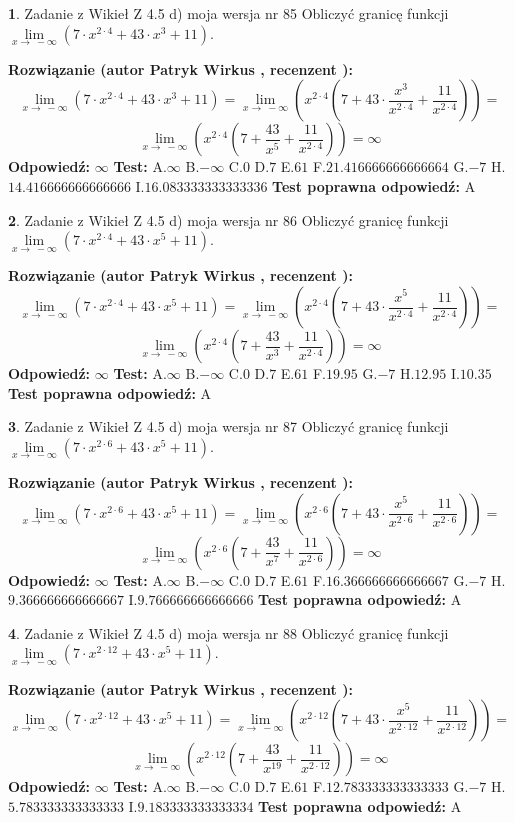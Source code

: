 \documentclass[12pt, a4paper]{article}
\theoremstyle{definition} %
\newtheorem{zad}{}
\newcommand{\zadStart}[1]{\begin{zad}#1\newline}
\newcommand{\zadStop}{\end{zad}}
\newcommand{\rozwStart}[2]{\noindent \textbf{Rozwiązanie (autor #1 , recenzent #2): }\newline}
\newcommand{\rozwStop}{\newline}
\newcommand{\odpStart}{\noindent \textbf{Odpowiedź:}\newline}
\newcommand{\odpStop}{\newline}
\newcommand{\testStart}{\noindent \textbf{Test:}\newline}
\newcommand{\testStop}{\newline}
\newcommand{\kluczStart}{\noindent \textbf{Test poprawna odpowiedź:}\newline}
\newcommand{\kluczStop}{\newline}
\begin{document}
\zadStart{Zadanie z Wikieł Z 4.5 d) moja wersja nr 85}
Obliczyć granicę funkcji  $\lim\limits_{x\to\ -\infty}(7 \cdot x^{2\cdot4}+43 \cdot x^{3}+11)$.
\zadStop
\rozwStart{Patryk Wirkus}{}
$$\lim\limits_{x\to\ -\infty}(7 \cdot x^{2\cdot4}+43 \cdot x^{3}+11) = \lim\limits_{x\to\ -\infty}(x^{2\cdot4}(7 +43 \cdot \frac{x^{3}}{x^{2\cdot4}}+\frac{11}{x^{2\cdot4}})) =$$ $$\lim\limits_{x\to\ -\infty}(x^{2\cdot4}(7 +\frac{43}{x^{5}}+\frac{11}{x^{2\cdot4}})) =\infty$$
\rozwStop
\odpStart
$\infty$
\odpStop
\testStart
A.$\infty$ B.$-\infty$ C.$0$ D.$7$ E.$61$
F.$21.416666666666664$ G.$-7$
H.$14.416666666666666$
I.$16.083333333333336$
\testStop
\kluczStart
A
\kluczStop



\zadStart{Zadanie z Wikieł Z 4.5 d) moja wersja nr 86}
Obliczyć granicę funkcji  $\lim\limits_{x\to\ -\infty}(7 \cdot x^{2\cdot4}+43 \cdot x^{5}+11)$.
\zadStop
\rozwStart{Patryk Wirkus}{}
$$\lim\limits_{x\to\ -\infty}(7 \cdot x^{2\cdot4}+43 \cdot x^{5}+11) = \lim\limits_{x\to\ -\infty}(x^{2\cdot4}(7 +43 \cdot \frac{x^{5}}{x^{2\cdot4}}+\frac{11}{x^{2\cdot4}})) =$$ $$\lim\limits_{x\to\ -\infty}(x^{2\cdot4}(7 +\frac{43}{x^{3}}+\frac{11}{x^{2\cdot4}})) =\infty$$
\rozwStop
\odpStart
$\infty$
\odpStop
\testStart
A.$\infty$ B.$-\infty$ C.$0$ D.$7$ E.$61$
F.$19.95$ G.$-7$
H.$12.95$
I.$10.35$
\testStop
\kluczStart
A
\kluczStop



\zadStart{Zadanie z Wikieł Z 4.5 d) moja wersja nr 87}
Obliczyć granicę funkcji  $\lim\limits_{x\to\ -\infty}(7 \cdot x^{2\cdot6}+43 \cdot x^{5}+11)$.
\zadStop
\rozwStart{Patryk Wirkus}{}
$$\lim\limits_{x\to\ -\infty}(7 \cdot x^{2\cdot6}+43 \cdot x^{5}+11) = \lim\limits_{x\to\ -\infty}(x^{2\cdot6}(7 +43 \cdot \frac{x^{5}}{x^{2\cdot6}}+\frac{11}{x^{2\cdot6}})) =$$ $$\lim\limits_{x\to\ -\infty}(x^{2\cdot6}(7 +\frac{43}{x^{7}}+\frac{11}{x^{2\cdot6}})) =\infty$$
\rozwStop
\odpStart
$\infty$
\odpStop
\testStart
A.$\infty$ B.$-\infty$ C.$0$ D.$7$ E.$61$
F.$16.366666666666667$ G.$-7$
H.$9.366666666666667$
I.$9.766666666666666$
\testStop
\kluczStart
A
\kluczStop



\zadStart{Zadanie z Wikieł Z 4.5 d) moja wersja nr 88}
Obliczyć granicę funkcji  $\lim\limits_{x\to\ -\infty}(7 \cdot x^{2\cdot12}+43 \cdot x^{5}+11)$.
\zadStop
\rozwStart{Patryk Wirkus}{}
$$\lim\limits_{x\to\ -\infty}(7 \cdot x^{2\cdot12}+43 \cdot x^{5}+11) = \lim\limits_{x\to\ -\infty}(x^{2\cdot12}(7 +43 \cdot \frac{x^{5}}{x^{2\cdot12}}+\frac{11}{x^{2\cdot12}})) =$$ $$\lim\limits_{x\to\ -\infty}(x^{2\cdot12}(7 +\frac{43}{x^{19}}+\frac{11}{x^{2\cdot12}})) =\infty$$
\rozwStop
\odpStart
$\infty$
\odpStop
\testStart
A.$\infty$ B.$-\infty$ C.$0$ D.$7$ E.$61$
F.$12.783333333333333$ G.$-7$
H.$5.783333333333333$
I.$9.183333333333334$
\testStop
\kluczStart
A
\kluczStop
\end{document}
